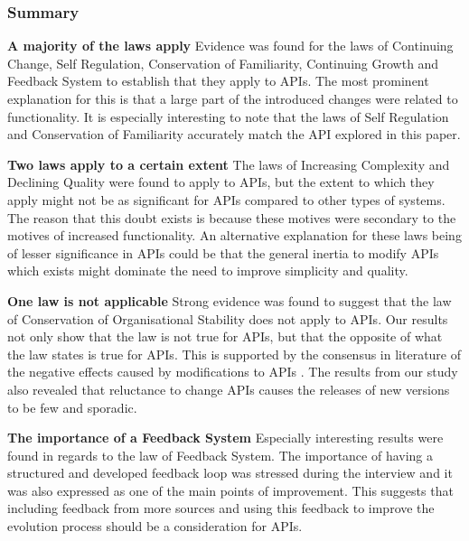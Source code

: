 \documentclass{sig-alternate}
\begin{document}
\subsubsection{Summary}

\noindent
\textbf{A majority of the laws apply  } %
Evidence was found for the laws of Continuing Change, Self Regulation, Conservation of Familiarity, Continuing Growth and Feedback System to establish that they apply to APIs. The most prominent explanation for this is that a large part of the introduced changes were related to functionality. It is especially interesting to note that the laws of Self Regulation and Conservation of Familiarity accurately match the API explored in this paper. 

\smallskip \noindent
\textbf{Two laws apply to a certain extent  } %
The laws of Increasing Complexity and Declining Quality were found to apply to APIs, but the extent to which they apply might not be as significant for APIs compared to other types of systems. The reason that this doubt exists is because these motives were secondary to the motives of increased functionality. An alternative explanation for these laws being of lesser significance in APIs could be that the general inertia to modify APIs which exists \cite{google_talk} \cite{henning2007api} \cite{mcdonnell2013empirical} \cite{robbes2012developers} might dominate the need to improve simplicity and quality. 

\smallskip \noindent
\textbf{One law is not applicable  } %
Strong evidence was found to suggest that the law of Conservation of Organisational Stability does not apply to APIs. Our results not only show that the law is not true for APIs, but that the opposite of what the law states is true for APIs. This is supported by the consensus in literature of the negative effects caused by modifications to APIs \cite{google_talk} \cite{henning2007api} \cite{mcdonnell2013empirical} \cite{robbes2012developers}. The results from our study also revealed that reluctance to change APIs causes the releases of new versions to be few and sporadic. 

\smallskip \noindent
\textbf{The importance of a Feedback System  } %
Especially interesting results were found in regards to the law of Feedback System. The importance of having a structured and developed feedback loop was stressed during the interview and it was also expressed as one of the main points of improvement. This suggests that including feedback from more sources and using this feedback to improve the evolution process should be a consideration for APIs. 
\end{document}
